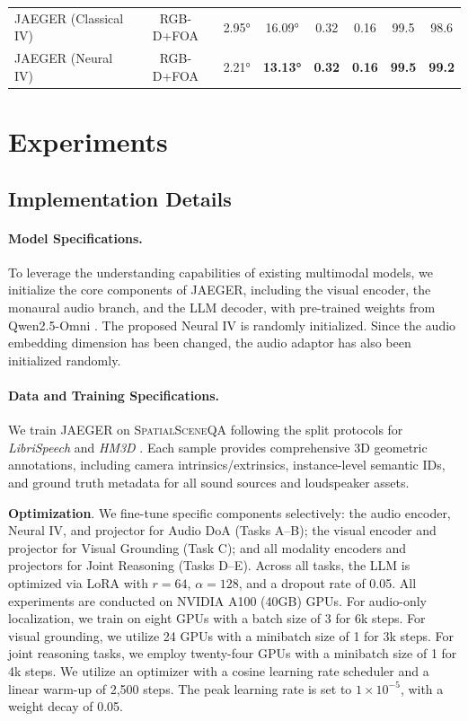 \begin{table}[t]
\begin{tabular}{l c cccc cc}
    \midrule
    
    JAEGER (Classical IV)     & RGB-D+FOA     & \ang{2.95} & \ang{16.09} & 0.32 & 0.16 & 99.5 & 98.6 \\
    JAEGER (Neural IV)      & RGB-D+FOA     & \ang{2.21} & \textbf{\ang{13.13}} & \textbf{0.32} & \textbf{0.16} & \textbf{99.5} & \textbf{99.2} \\
    
    \bottomrule
    \end{tabular}
    \label{tab:main}
\end{table}
\section{Experiments}

\subsection{Implementation Details}

\paragraph{Model Specifications.}
To leverage the understanding capabilities of existing multimodal models, we initialize the core components of JAEGER, including the visual encoder, the monaural audio branch, and the LLM decoder, with pre-trained weights from Qwen2.5-Omni \cite{xu2025qwen2}. The proposed Neural IV is randomly initialized. Since the audio embedding dimension has been changed, the audio adaptor has also been initialized randomly.

\paragraph{Data and Training Specifications.}
We train JAEGER on \textsc{SpatialSceneQA} following the split protocols for \textit{LibriSpeech} \cite{panayotov2015librispeech} and \textit{HM3D} \cite{ramakrishnan2021habitat}. Each sample provides comprehensive 3D geometric annotations, including camera intrinsics/extrinsics, instance-level semantic IDs, and ground truth metadata for all sound sources and loudspeaker assets.

\textbf{Optimization}. We fine-tune specific components selectively: the audio encoder, Neural IV, and projector for Audio DoA (Tasks A--B); the visual encoder and projector for Visual Grounding (Task C); and all modality encoders and projectors for Joint Reasoning (Tasks D--E). Across all tasks, the LLM is optimized via LoRA with $r=64$, $\alpha=128$, and a dropout rate of 0.05.
%
All experiments are conducted on NVIDIA A100 (40GB) GPUs. For audio-only localization, we train on eight GPUs with a batch size of 3 for 6k steps. For visual grounding, we utilize 24 GPUs with a minibatch size of 1 for 3k steps. For joint reasoning tasks, we employ twenty-four GPUs with a minibatch size of 1 for 4k steps. We utilize an optimizer with a cosine learning rate scheduler and a linear warm-up of 2,500 steps. The peak learning rate is set to $1 \times 10^{-5}$, with a weight decay of 0.05.


